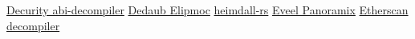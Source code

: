 \href{\urlcodeabidecompiler}{Decurity abi-decompiler}
\href{\urlwebdedaub}{Dedaub Elipmoc}
\href{\urlcodeheimdallrs}{heimdall-rs}
\href{\urlcodepanoramix}{Eveel Panoramix}
\href{\urlwebetherscandecompiler}{Etherscan decompiler}
